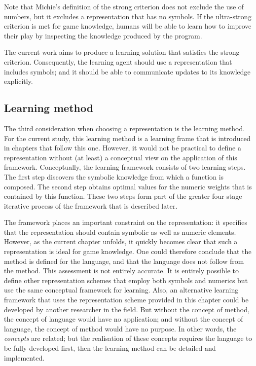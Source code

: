 Note that Michie's definition of the strong criterion does not exclude the use of numbers, but it excludes a representation that has no symbols.  If the ultra-strong criterion is met for game knowledge, humans will be able to learn how to improve their play by inspecting the knowledge produced by the program.

The current work aims to produce a learning solution that satisfies the strong criterion.  Consequently, the learning agent should use a representation that includes symbols; and it should be able to communicate updates to its knowledge explicitly.  

\subsection*{Learning method}
The third consideration when choosing a representation is the learning method.  For the current study, this learning method is a learning frame that is introduced in chapters that follow this one.  However, it would not be practical to define a representation without (at least) a conceptual view on the application of this framework.  Conceptually, the learning framework consists of two learning steps. The first step discovers the symbolic knowledge from which a function is composed. The second step obtains optimal values for the numeric weights that is contained by this function.  These two steps form part of the greater four stage iterative process of the framework that is described later. 

The framework places an important constraint on the representation:  it specifies that the representation should contain symbolic as well as numeric elements.  However, as the current chapter unfolds, it quickly becomes clear that such a representation is ideal for game knowledge.  One could therefore conclude that the method is defined for the language, and that the language does not follow from the method. This assessment is not entirely accurate. It is entirely possible to define other representation schemes that employ both symbols and numerics but use the same conceptual framework for learning.  Also, an alternative learning framework that uses the representation scheme provided in this chapter could be developed by another researcher in the field.  But without the concept of method, the concept of language would have no application; and without the concept of language, the concept of method would have no purpose.  In other words, the {\it concepts} are related; but the realisation of these concepts requires the language to be fully developed first, then the learning method can be detailed and implemented.  

